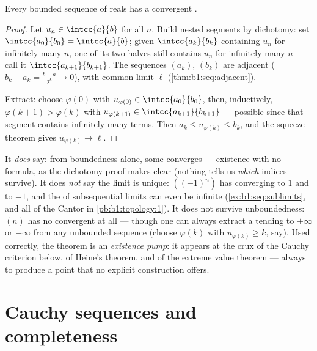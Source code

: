 \begin{theorem}\label{thm:b1:seq:bw}
Every bounded sequence of reals has a convergent
.
\end{theorem}

\begin{proof}
Let $u_n \in \intcc{a}{b}$ for all $n$. Build nested segments by
dichotomy: set $\intcc{a_0}{b_0} = \intcc{a}{b}$; given
$\intcc{a_k}{b_k}$ containing $u_n$ for infinitely many $n$, one of
its two halves still contains $u_n$ for infinitely many $n$ --- call
it $\intcc{a_{k+1}}{b_{k+1}}$. The sequences $(a_k)$, $(b_k)$ are
adjacent ($b_k - a_k = \frac{b-a}{2^k} \to 0$), with common limit
$\ell$ (\cref{thm:b1:seq:adjacent}).

Extract: choose $\varphi(0)$ with $u_{\varphi(0)} \in
\intcc{a_0}{b_0}$, then, inductively, $\varphi(k+1) > \varphi(k)$
with $u_{\varphi(k+1)} \in \intcc{a_{k+1}}{b_{k+1}}$ --- possible
since that segment contains infinitely many terms. Then $a_k \leq
u_{\varphi(k)} \leq b_k$, and the squeeze theorem gives
$u_{\varphi(k)} \to \ell$.
\end{proof}

\begin{remark}
It \emph{does} say: from boundedness alone, some 
converges --- existence with no formula, as the dichotomy proof
makes clear (nothing tells us \emph{which} indices survive). It
does \emph{not} say the limit is unique: $((-1)^n)$ has
 converging to $1$ and to $-1$, and the  of
subsequential limits can even be infinite
(\cref{ex:b1:seq:sublimits}, and all of the Cantor  in
\cref{pb:b1:topology:1}). It does not survive unboundedness:
$(n)$ has no convergent  at all --- though one can
always extract a  tending to $+\infty$ or $-\infty$
from any unbounded sequence (choose $\varphi(k)$ with
$u_{\varphi(k)} \geq k$, say). Used correctly, the theorem is an
\emph{existence pump}: it appears at the crux of the Cauchy
criterion below, of Heine's theorem, and of the extreme value
theorem --- always to produce a point that no explicit
construction offers.
\end{remark}

\section{Cauchy sequences and completeness}

